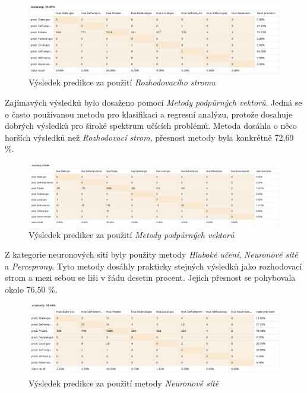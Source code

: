 \documentclass[11pt,a4paper,titlepage]{article}
\begin{document}
            \begin{figure}[H]
                \centering
                \includegraphics[width=1\textwidth]{./img/presnost_tree.png}
                \caption{Výsledek predikce za použití \textit{Rozhodovacího stromu}}
            \end{figure}

            Zajímavých výsledků bylo dosaženo pomocí \textit{Metody podpůrných vektorů}. Jedná se o často používanou metodu pro klasifikaci a regresní analýzu, protože dosahuje dobrých výsledků pro široké spektrum učících problémů. Metoda dosáhla o něco horších výsledků než \textit{Rozhodovací strom}, přesnost metody byla konkrétně 72,69 \%.

            \begin{figure}[H]
                \centering
                \includegraphics[width=1\textwidth]{./img/presnost_svm.png}
                \caption{Výsledek predikce za použití \textit{Metody podpůrných vektorů}}
            \end{figure}

            Z kategorie neuronových sítí byly použity metody \textit{Hluboké učení}, \textit{Neuronové sítě} a \textit{Perceprony}. Tyto metody dosáhly prakticky stejných výsledků jako rozhodovací strom a mezi sebou se liši v řádu desetin procent. Jejich přesnost se pohybovala okolo 76,50 \%.

            \begin{figure}[H]
                \centering
                \includegraphics[width=1\textwidth]{./img/presnost_neural.png}
                \caption{Výsledek predikce za použití metody \textit{Neuronové sítě}}
            \end{figure}
\end{document}
